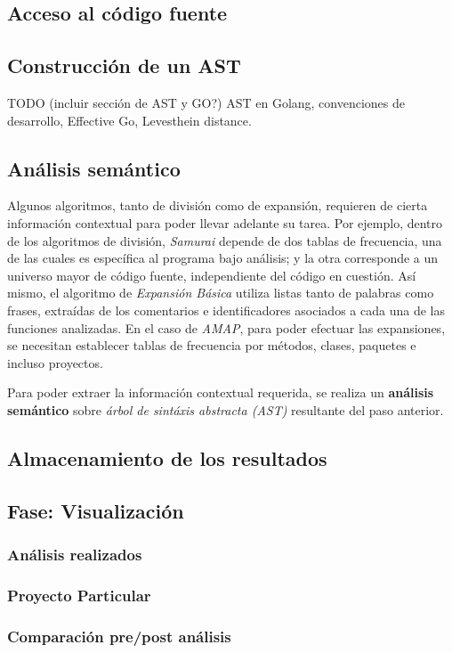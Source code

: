 \subsection{Acceso al código fuente}

\subsection{Construcción de un AST}
TODO (incluir sección de AST y GO?)
AST en Golang, convenciones de desarrollo, Effective Go, Levesthein distance.

\subsection{Análisis semántico}
Algunos algoritmos, tanto de división como de expansión, requieren de cierta información contextual para poder llevar adelante su tarea.
Por ejemplo, dentro de los algoritmos de división, \textit{Samurai} depende de dos tablas de frecuencia, una de las cuales es específica al programa bajo análisis; y la otra corresponde a un universo mayor de código fuente, independiente del código en cuestión.
Así mismo, el algoritmo de \textit{Expansión Básica} utiliza listas tanto de palabras como frases, extraídas de los comentarios e identificadores asociados a cada una de las funciones analizadas.
En el caso de \textit{AMAP}, para poder efectuar las expansiones, se necesitan establecer tablas de frecuencia por métodos, clases, paquetes e incluso proyectos.

Para poder extraer la información contextual requerida, se realiza un \textbf{análisis semántico} sobre \textit{árbol de sintáxis abstracta (AST)} resultante del paso anterior.

\subsection{Almacenamiento de los resultados}


\subsection{Fase: Visualización}

\subsubsection{Análisis realizados}
\subsubsection{Proyecto Particular}
\subsubsection{Comparación pre/post análisis}

